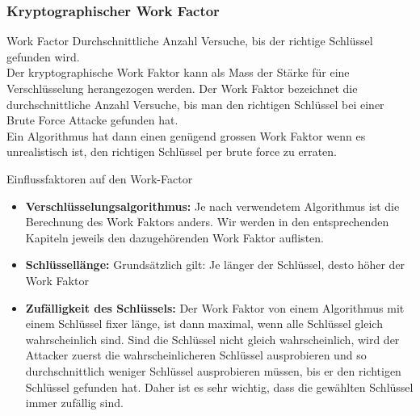 \subsubsection{Kryptographischer Work Factor}

\begin{definition}{Work Factor}
    Durchschnittliche Anzahl Versuche, bis der richtige Schlüssel gefunden wird.
    \vspace{2mm}\\
    Der kryptographische Work Faktor kann als Mass der Stärke für eine Verschlüsselung herangezogen werden. Der Work Faktor bezeichnet die durchschnittliche Anzahl Versuche, bis man den richtigen Schlüssel bei einer Brute Force Attacke gefunden hat.
    \vspace{2mm}\\
    Ein Algorithmus hat dann einen genügend grossen Work Faktor wenn es unrealistisch ist, den richtigen Schlüssel per brute force zu erraten.
\end{definition}

\begin{concept}{Einflussfaktoren auf den Work-Factor}
    \begin{itemize}
        \item \textbf{Verschlüsselungsalgorithmus:} Je nach verwendetem Algorithmus ist die Berechnung des Work Faktors anders. Wir werden in den entsprechenden Kapiteln jeweils den dazugehörenden Work Faktor auflisten.
        \item \textbf{Schlüssellänge:} Grundsätzlich gilt: Je länger der Schlüssel, desto höher der Work Faktor
        \item \textbf{Zufälligkeit des Schlüssels:} Der Work Faktor von einem Algorithmus mit einem Schlüssel fixer länge, ist dann maximal, wenn alle Schlüssel gleich wahrscheinlich sind. Sind die Schlüssel nicht gleich wahrscheinlich, wird der Attacker zuerst die wahrscheinlicheren Schlüssel ausprobieren und so durchschnittlich weniger Schlüssel ausprobieren müssen, bis er den richtigen Schlüssel gefunden hat. Daher ist es sehr wichtig, dass die gewählten Schlüssel immer zufällig sind.
    \end{itemize}
\end{concept}

